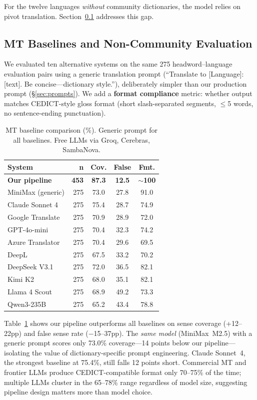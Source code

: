 \documentclass[11pt]{article}
\begin{document}
For the twelve languages \textit{without} community dictionaries, the model relies on pivot translation. Section~\ref{sec:mt-baselines} addresses this gap.

\subsection{MT Baselines and Non-Community Evaluation}
\label{sec:mt-baselines}

We evaluated ten alternative systems on the same 275 headword--language evaluation pairs using a generic translation prompt (``Translate to [Language]: [text]. Be concise---dictionary style.''), deliberately simpler than our production prompt (\S\ref{sec:prompts}). We add a \textbf{format compliance} metric: whether output matches CEDICT-style gloss format (short slash-separated segments, $\leq$5 words, no sentence-ending punctuation).

\begin{table}[t]
\centering
\small
\begin{tabular}{lrccc}
\toprule
\textbf{System} & \textbf{n} & \textbf{Cov.} & \textbf{False} & \textbf{Fmt.} \\
\midrule
\textbf{Our pipeline} & \textbf{453} & \textbf{87.3} & \textbf{12.5} & \textbf{$\sim$100} \\
MiniMax (generic) & 275 & 73.0 & 27.8 & 91.0 \\
\addlinespace
Claude Sonnet 4 & 275 & 75.4 & 28.7 & 74.9 \\
Google Translate & 275 & 70.9 & 28.9 & 72.0 \\
GPT-4o-mini     & 275 & 70.4 & 32.3 & 74.2 \\
Azure Translator & 275 & 70.4 & 29.6 & 69.5 \\
DeepL            & 275 & 67.5 & 33.2 & 70.2 \\
\addlinespace
DeepSeek V3.1   & 275 & 72.0 & 36.5 & 82.1 \\
Kimi K2         & 275 & 68.0 & 35.1 & 82.1 \\
Llama 4 Scout   & 275 & 68.9 & 49.2 & 73.3 \\
Qwen3-235B      & 275 & 65.2 & 43.4 & 78.8 \\
\bottomrule
\end{tabular}
\caption{MT baseline comparison (\%). Generic prompt for all baselines. Free LLMs via Groq, Cerebras, SambaNova.}
\label{tab:mt-baseline}
\end{table}

\label{sec:backtrans}
Table~\ref{tab:mt-baseline} shows our pipeline outperforms all baselines on sense coverage (+12--22pp) and false sense rate ($-$15--37pp). The \emph{same model} (MiniMax~M2.5) with a generic prompt scores only 73.0\% coverage---14 points below our pipeline---isolating the value of dictionary-specific prompt engineering. Claude Sonnet~4, the strongest baseline at 75.4\%, still falls 12 points short. Commercial MT and frontier LLMs produce CEDICT-compatible format only 70--75\% of the time; multiple LLMs cluster in the 65--78\% range regardless of model size, suggesting pipeline design matters more than model choice.
\end{document}
